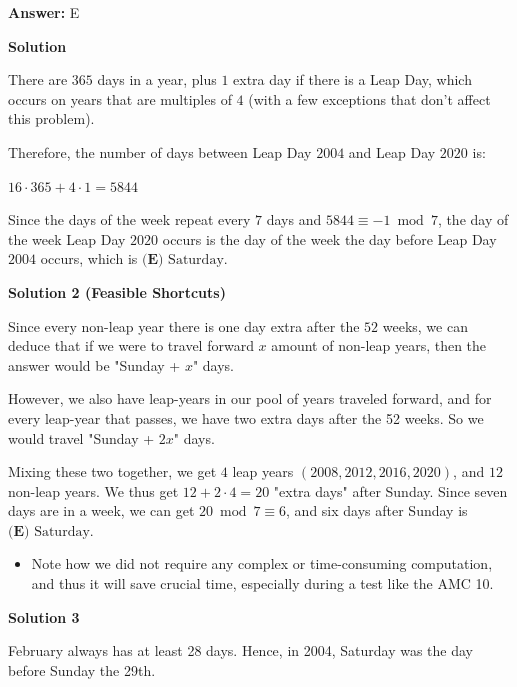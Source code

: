 \begin{enumerate}
 \textbf{Answer: }E



\textbf{Solution}

There are $365$ days in a year, plus $1$ extra day if there is a Leap Day, which occurs on years that are multiples of $4$ (with a few exceptions that don't affect this problem).  

 Therefore, the number of days between Leap Day $2004$ and Leap Day $2020$ is:  

 $16 \cdot 365 + 4 \cdot 1 = 5844$

 Since the days of the week repeat every $7$ days and $5844 \equiv -1 \bmod{7}$, the day of the week Leap Day $2020$ occurs is the day of the week the day before Leap Day $2004$ occurs, which is $\boxed{\textbf{(E) }\textrm{Saturday}}$.

 



\textbf{Solution 2 (Feasible Shortcuts)}

Since every non-leap year there is one day extra after the $52$ weeks, we can deduce that if we were to travel forward $x$ amount of non-leap years, then the answer would be "Sunday + $x$" days.

 However, we also have leap-years in our pool of years traveled forward, and for every leap-year that passes, we have two extra days after the 52 weeks. So we would travel "Sunday + $2x$" days. 

 Mixing these two together, we get $4$ leap years $(2008, 2012, 2016, 2020)$, and $12$ non-leap years. We thus get $12 + 2\cdot 4 = 20$ "extra days" after Sunday. Since seven days are in a week, we can get $20 \bmod{7} \equiv 6$, and six days after Sunday is $\boxed{\textbf{(E) }\textrm{Saturday}}$.

 
            \begin{itemize}
        \item Note how we did not require any complex or time-consuming computation, and thus it will save crucial time, especially during a test like the AMC 10.
            \end{itemize}
            



\textbf{Solution 3}

February always has at least 28 days. Hence, in 2004, Saturday was the day before Sunday the 29th.


\end{enumerate}

